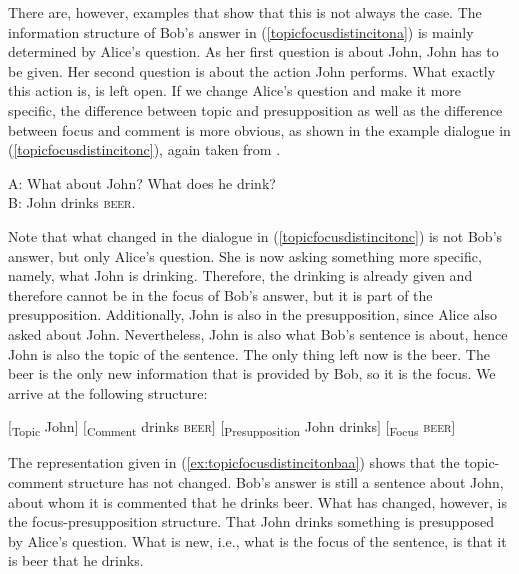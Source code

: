 \noindent There are, however, examples that show that this is not always the case. The information structure of Bob's answer in (\ref{topicfocusdistincitona}) is mainly determined by Alice's question. As her first question is about John, John has to be given. Her second question is about the action John performs. What exactly this action is, is left open. If we change Alice's question and make it more specific, the difference between topic and presupposition as well as the difference between focus and comment is more obvious, as shown in the example dialogue in (\ref{topicfocusdistincitonc}), again taken from \citet[468]{vallduvi1996linguistic}.

\begin{exe}
\ex\label{topicfocusdistincitonc}
A: What about John? What does he drink? \\
B: John drinks \textsc{beer}.
\end{exe}

\noindent Note that what changed in the dialogue in (\ref{topicfocusdistincitonc}) is not Bob's answer, but only Alice's question. She is now asking something more specific, namely, what John is drinking. Therefore, the drinking is already given and therefore cannot be in the focus of Bob's answer, but it is part of the presupposition. Additionally, John is also in the presupposition, since Alice also asked about John. Nevertheless, John is also what Bob's sentence is about, hence John is also the topic of the sentence. The only thing left now is the beer. The beer is the only new information that is provided by Bob, so it is the focus. We arrive at the following structure:

\begin{exe}
\ex\label{topicfocusdistincitond}\begin{xlist}
\ex $[$\textsubscript{Topic} John$]$ $[$\textsubscript{Comment} drinks \textsc{beer}$]$ \label{ex:topicfocusdistincitonbaa}
\ex $[$\textsubscript{Presupposition} John drinks$]$ $[$\textsubscript{Focus} \textsc{beer}$]$ \label{ex:topicfocusdistincitonbbb}
\end{xlist}
\end{exe}

\noindent The representation given in (\ref{ex:topicfocusdistincitonbaa}) shows that the topic-comment structure has not changed. Bob's answer is still a sentence about John, about whom it is commented that he drinks beer. What has changed, however, is the focus-pre\-sup\-posi\-tion structure. That John drinks something is presupposed by Alice's question. What is new, i.e., what is the focus of the sentence, is that it is beer that he drinks.

